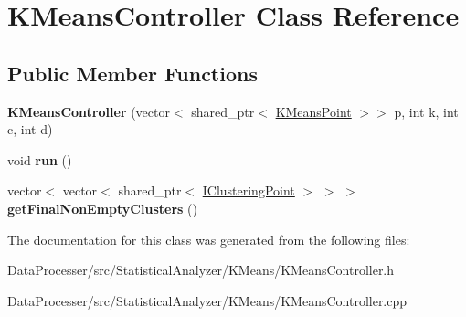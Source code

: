 \hypertarget{classKMeansController}{}\section{K\+Means\+Controller Class Reference}
\label{classKMeansController}
\subsection*{Public Member Functions}
\begin{DoxyCompactItemize}
\item 
\mbox{\label{classKMeansController_ae8d2e164feb89f8f6501d0f57309eda1}} 
{\bfseries K\+Means\+Controller} (vector$<$ shared\+\_\+ptr$<$ \hyperlink{classKMeansPoint}{K\+Means\+Point} $>$$>$ p, int k, int c, int d)
\item 
\mbox{\label{classKMeansController_aac8c187bc425b58780e25dadecb710f9}} 
void {\bfseries run} ()
\item 
\mbox{\label{classKMeansController_a7906053fb37cc9184d9d9ecdd1b1bbc4}} 
vector$<$ vector$<$ shared\+\_\+ptr$<$ \hyperlink{classIClusteringPoint}{I\+Clustering\+Point} $>$ $>$ $>$ {\bfseries get\+Final\+Non\+Empty\+Clusters} ()
\end{DoxyCompactItemize}


The documentation for this class was generated from the following files\+:\begin{DoxyCompactItemize}
\item 
Data\+Processer/src/\+Statistical\+Analyzer/\+K\+Means/K\+Means\+Controller.\+h\item 
Data\+Processer/src/\+Statistical\+Analyzer/\+K\+Means/K\+Means\+Controller.\+cpp\end{DoxyCompactItemize}
